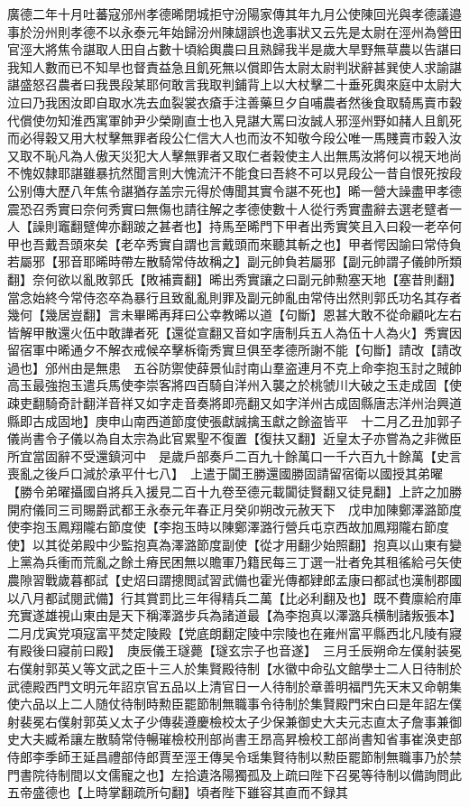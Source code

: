 廣德二年十月吐蕃寇邠州孝德晞閉城拒守汾陽家傳其年九月公使陳回光與孝德議邉事於汾州則孝德不以永泰元年始歸汾州陳翃誤也逸事狀又云先是太尉在涇州為營田官涇大將焦令諶取人田自占數十頃給輿農曰且熟歸我半是歲大旱野無草農以告諶曰我知人數而已不知旱也督責益急且飢死無以償即告太尉太尉判狀辭甚巽使人求諭諶諶盛怒召農者曰我畏段某耶何敢言我取判鋪背上以大杖擊二十垂死輿來庭中太尉大泣曰乃我困汝即自取水冼去血裂裳衣瘡手注善藥旦夕自哺農者然後食取騎馬賣市穀代償使勿知淮西寓軍帥尹少榮剛直士也入見諶大罵曰汝誠人邪涇州野如赭人且飢死而必得穀又用大杖擊無罪者段公仁信大人也而汝不知敬今段公唯一馬賤賣市穀入汝又取不恥凡為人傲天災犯大人擊無罪者又取仁者穀使主人出無馬汝將何以視天地尚不愧奴隸耶諶雖暴抗然聞言則大愧流汗不能食曰吾終不可以見段公一昔自恨死按段公别傳大歷八年焦令諶猶存盖宗元得於傳聞其實令諶不死也】晞一營大譟盡甲孝德震恐召秀實曰奈何秀實曰無傷也請往解之孝德使數十人從行秀實盡辭去選老躄者一人【譟則竈翻躄俾亦翻跛之甚者也】持馬至晞門下甲者出秀實笑且入曰殺一老卒何甲也吾戴吾頭來矣【老卒秀實自謂也言戴頭而來聽其斬之也】甲者愕因諭曰常侍負若屬邪【邪音耶晞時帶左散騎常侍故稱之】副元帥負若屬邪【副元帥謂子儀帥所類翻】奈何欲以亂敗郭氏【敗補賣翻】晞出秀實讓之曰副元帥勲塞天地【塞昔則翻】當念始終今常侍恣卒為暴行且致亂亂則罪及副元帥亂由常侍出然則郭氏功名其存者幾何【幾居豈翻】言未畢晞再拜曰公幸教晞以道【句斷】恩甚大敢不從命顧叱左右皆解甲散還火伍中敢譁者死【還從宣翻又音如字唐制兵五人為伍十人為火】秀實因留宿軍中晞通夕不解衣戒候卒擊柝衛秀實旦俱至孝德所謝不能【句斷】請改【請改過也】邠州由是無患　五谷防禦使薛景仙討南山羣盗連月不克上命李抱玉討之賊帥高玉最強抱玉遣兵馬使李崇客將四百騎自洋州入襲之於桃虢川大破之玉走成固【使疎吏翻騎奇計翻洋音祥又如字走音奏將即亮翻又如字洋州古成固縣唐志洋州治興道縣即古成固地】庚申山南西道節度使張獻誠擒玉獻之餘盗皆平　十二月乙丑加郭子儀尚書令子儀以為自太宗為此官累聖不復置【復扶又翻】近皇太子亦嘗為之非微臣所宜當固辭不受還鎮河中　是歲戶部奏戶二百九十餘萬口一千六百九十餘萬【史言喪亂之後戶口減於承平什七八】　上遣于闐王勝還國勝固請留宿衛以國授其弟曜【勝令弟曜攝國自將兵入援見二百十九卷至德元載闐徒賢翻又徒見翻】上許之加勝開府儀同三司賜爵武都王永泰元年春正月癸卯朔改元赦天下　戊申加陳鄭澤潞節度使李抱玉鳳翔隴右節度使【李抱玉時以陳鄭澤潞行營兵屯京西故加鳳翔隴右節度使】以其從弟殿中少監抱真為澤潞節度副使【從才用翻少始照翻】抱真以山東有變上黨為兵衝而荒亂之餘土瘠民困無以贍軍乃籍民每三丁選一壯者免其租徭給弓矢使農隙習戰歲暮都試【史炤曰謂摠閲試習武備也霍光傳都肄郎孟康曰都試也漢制郡國以八月都試閱武備】行其賞罰比三年得精兵二萬【比必利翻及也】既不費廪給府庫充實遂雄視山東由是天下稱澤潞步兵為諸道最【為李抱真以澤潞兵横制諸叛張本】　二月戊寅党項寇富平焚定陵殿【党底朗翻定陵中宗陵也在雍州富平縣西北凡陵有寢有殿後曰寢前曰殿】　庚辰儀王璲薨【璲玄宗子也音遂】　三月壬辰朔命左僕射装冕右僕射郭英乂等文武之臣十三人於集賢殿待制【水徽中命弘文館學士二人日待制於武德殿西門文明元年詔京官五品以上清官日一人待制於章善明福門先天末又命朝集使六品以上二人随仗待制時勲臣罷節制無職事令待制於集賢殿門宋白曰是年詔左僕射裴冕右僕射郭英乂太子少傳裴遵慶檢校太子少保兼御史大夫元志直太子詹事兼御史大夫臧希讓左散騎常侍暢璀檢校刑部尚書王昂高昇檢校工部尚書知省事崔涣吏部侍郎李季師王延昌禮部侍郎賈至涇王傳吴令瑶集賢待制以勲臣罷節制無職事乃於禁門書院待制間以文儒寵之也】左拾遺洛陽獨孤及上疏曰陛下召冕等待制以備詢問此五帝盛德也【上時掌翻疏所句翻】頃者陛下雖容其直而不録其